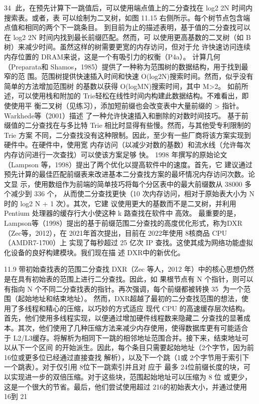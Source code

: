                                                                                     34
此，在预先计算下一跳值后，可以使用端点值上的二分查找在 log2 2N 时间内搜索表。或者，表
可以绘制为二叉树，如图 11.15 右侧所示。每个树节点包含端点值和相同的两个下一跳条目。
到目前为止的描述表明，基于值的二分查找可以在 log2 2N 时间内找到最长前缀匹配。然而，可
以使用更高基数的二叉树（如 B树）来减少时间。虽然这样的树需要更宽的内存访问，但对于允
许快速访问连续内存位置的 DRAM来说，这是一个有吸引力的权衡（P4a）。
计算几何（Preparata和 Shamos，1985）提供了一种称为范围树的数据结构，用于找到最窄的范
围。范围树提供快速插入时间和快速 O(log2N)搜索时间。然而，似乎没有简单的方法增加范围树
的基数以获得 O(logMN)搜索时间，其中 M>2。
如前所述，可以使用栈和附加的 Trie轻松在线性时间内构建此数据结构。不难看出，即使使用平
衡二叉树（见练习），添加短前缀也会改变表中大量前缀的 > 指针。Warkhede等（2001）描述
了一种允许快速插入和删除的对数时间技巧。
基于前缀值的二分查找在与多比特 Trie 相比时显得有些慢。然而，与其他受专利限制的 Trie 方案
不同，二分查找没有这种限制。因此，至少有一些厂商将该方案实现到硬件中。在硬件中，使用宽
内存访问（以减少对数的基数）和流水线（允许每次内存访问进行一次查找）可以使该方案足够
快。
1998 年撰写的原始论文（Lampson 等，1998）提出了两个优化以提高软件中的速度。首先，它
建议通过预先计算的最佳匹配前缀表来改进基本二分查找方案的最坏情况内存访问次数。论文显
示，使用数组作为前端的简单技巧将每个分区表中的最大前缀数从 38000 多个减少到 336 个，
从而使二分查找更快（10 次内存访问，相对于原始表大小为 N时的 log2 N + 1 次）。其次，它建
议使用更大的基数而不是二叉树，并利用 Pentium 处理器的缓存行大小使这种 k 路查找在软件中
高效。
最重要的是，Lampson等（1998）提出的基于前缀范围二分查找的高度优化形式，称为DXR
（Zec等，2012），在 2021年首次提出，目前在 2022年使用 8核商品 CPU（AMDR7-1700）上
实现了每秒超过 25 亿次 IP 查找。这使其成为网络功能虚拟化设备的良好构建模块。我们现在描
述 DXR中的新优化。



11.9 带初始查找表的范围二分查找
DXR（Zec 等人，2012 年）中的核心思想仍然是在具有初始表的范围上进行二分查找。因此，如
果根节点有 N 个指针，则可以有指向 N 个不同二分查找表的指针。再次强调，每个前缀都被转换
                                                       35
为一个范围（起始地址和结束地址）。
然而，DXR超越了最初的二分查找范围的想法，使用了多线程和精心的压缩，以巧妙的方式适应
现代 CPU 的高速缓存层次结构。首先，他们使用多线程实现，以便通过增加硬件线程数来隐藏二
分查找的显著成本。其次，他们使用了几种压缩方法来减少内存使用，使得数据库更有可能适合
于 L2/L3缓存。将解析为相同下一跳的相邻地址范围合并。接下来，结束地址可以从下一个区间
的开始派生。因此，每个条目只需要起始地址（2个字节，因为前 16位或更多位已经通过直接查找
解析），以及下一个跳（1或 2个字节用于索引下一个跳表）。对于仅引用 8位下一跳索引并且对
应于
最多 24位前缀长度的块，可以实现进一步的双倍压缩。对于这些块，范围起始地址可以压缩为 8
位
或更少，这是一个很大的节省。最后，他们尝试使用超过 216的初始表大小，并通过使用 16到 21



